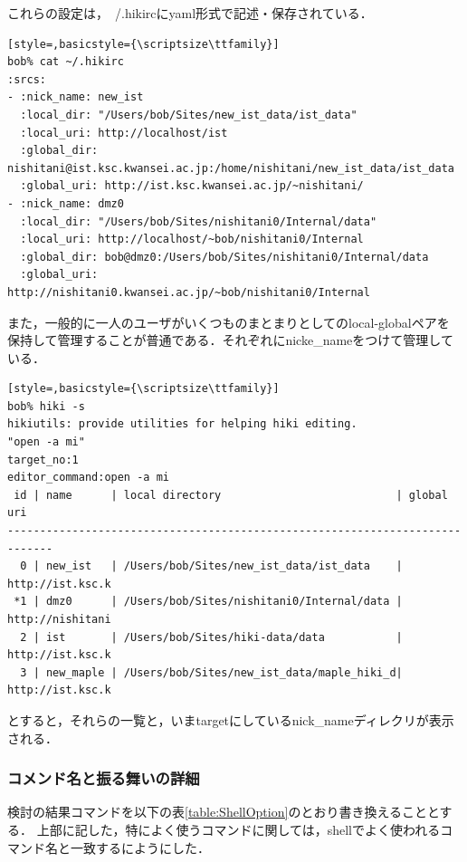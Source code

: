 これらの設定は，~/.hikircにyaml形式で記述・保存されている．
\begin{lstlisting}[style=,basicstyle={\scriptsize\ttfamily}]
bob% cat ~/.hikirc
:srcs:
- :nick_name: new_ist
  :local_dir: "/Users/bob/Sites/new_ist_data/ist_data"
  :local_uri: http://localhost/ist
  :global_dir: nishitani@ist.ksc.kwansei.ac.jp:/home/nishitani/new_ist_data/ist_data
  :global_uri: http://ist.ksc.kwansei.ac.jp/~nishitani/
- :nick_name: dmz0
  :local_dir: "/Users/bob/Sites/nishitani0/Internal/data"
  :local_uri: http://localhost/~bob/nishitani0/Internal
  :global_dir: bob@dmz0:/Users/bob/Sites/nishitani0/Internal/data
  :global_uri: http://nishitani0.kwansei.ac.jp/~bob/nishitani0/Internal
\end{lstlisting}
また，一般的に一人のユーザがいくつものまとまりとしてのlocal-globalペアを
保持して管理することが普通である．それぞれにnicke\_nameをつけて管理している．
\begin{lstlisting}[style=,basicstyle={\scriptsize\ttfamily}]
bob% hiki -s
hikiutils: provide utilities for helping hiki editing.
"open -a mi"
target_no:1
editor_command:open -a mi
 id | name      | local directory                           | global uri     
-----------------------------------------------------------------------------
  0 | new_ist   | /Users/bob/Sites/new_ist_data/ist_data    | http://ist.ksc.k
 *1 | dmz0      | /Users/bob/Sites/nishitani0/Internal/data | http://nishitani
  2 | ist       | /Users/bob/Sites/hiki-data/data           | http://ist.ksc.k
  3 | new_maple | /Users/bob/Sites/new_ist_data/maple_hiki_d| http://ist.ksc.k
\end{lstlisting}
とすると，それらの一覧と，いまtargetにしているnick\_nameディレクリが表示される．

\subsubsection{コメンド名と振る舞いの詳細}
検討の結果コマンドを以下の表\ref{table:ShellOption}のとおり書き換えることとする．
上部に記した，特によく使うコマンドに関しては，shellでよく使われるコマンド名と一致するにようにした．


